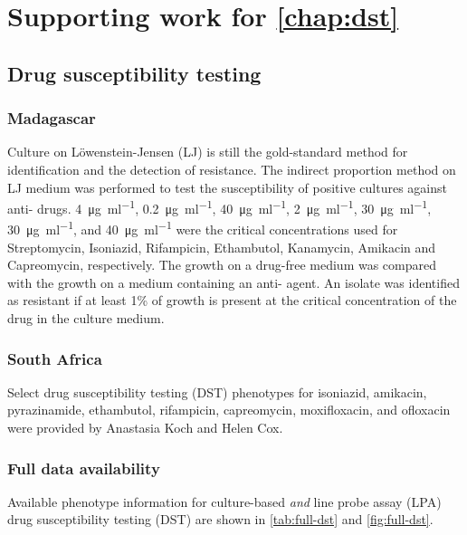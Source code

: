 \chapter{Supporting work for \autoref*{chap:dst}}

\section{Drug susceptibility testing}
\label{app:dst-ext-methods}
\subsection{Madagascar}

Culture on Löwenstein-Jensen (LJ) is still the gold-standard method for \mtb{} identification and the detection of resistance. The indirect proportion method on LJ medium was performed to test the susceptibility of positive cultures against anti-\mtb{} drugs. \SI{4}{\ug\per\ml}, \SI{0.2}{\ug\per\ml}, \SI{40}{\ug\per\ml}, \SI{2}{\ug\per\ml}, \SI{30}{\ug\per\ml}, \SI{30}{\ug\per\ml}, and \SI{40}{\ug\per\ml} were the critical concentrations used for Streptomycin, Isoniazid, Rifampicin, Ethambutol, Kanamycin, Amikacin and Capreomycin, respectively. The growth on a drug-free medium was compared with the growth on a medium containing an anti-\mtb{} agent. An isolate was identified as resistant if at least 1\% of growth is present at the critical concentration of the drug in the culture medium.  

\subsection{South Africa}

Select drug susceptibility testing (DST) phenotypes for isoniazid, amikacin, pyrazinamide, ethambutol, rifampicin, capreomycin, moxifloxacin, and ofloxacin were provided by Anastasia Koch and Helen Cox. 

\subsection{Full data availability}
\label{app:full-dst}

Available phenotype information for culture-based \emph{and} line probe assay (LPA) drug susceptibility testing (DST) are shown in \autoref{tab:full-dst} and \autoref{fig:full-dst}.


